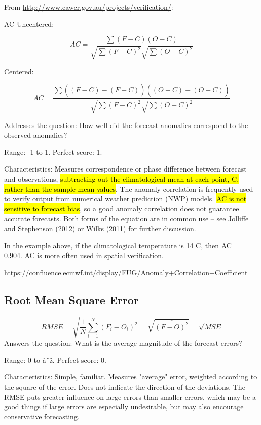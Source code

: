 \documentclass[12pt,a4paper]{article}
\begin{document}
From \url{http://www.cawcr.gov.au/projects/verification/}:

AC Uncentered:

\begin{equation}
AC = \frac{\sum {(F-C)(O-C)}}{\sqrt{\sum{(F-C)^2}} \sqrt{\sum{(O-C)^2}}}    
\end{equation}

Centered:

\begin{equation}
AC = \frac{
\sum{ \left( (F-C) - \overline{(F-C)} \right) \left( (O-C) - \overline{(O-C)} \right)}}
{\sqrt{\sum{ (F-C)^2}} \sqrt{\sum{(O-C)^2}}}  
\end{equation}

Addresses the question: How well did the forecast anomalies correspond to the observed anomalies?

Range: -1 to 1.  Perfect score: 1.

Characteristics: Measures correspondence or phase difference between forecast and observations, \hl{subtracting out the climatological mean at each point, C, rather than the sample mean values}. The anomaly correlation is frequently used to verify output from numerical weather prediction (NWP) models. \hl{AC is not sensitive to forecast bias}, so a good anomaly correlation does not guarantee accurate forecasts. Both forms of the equation are in common use -- see Jolliffe and Stephenson (2012) or Wilks (2011) for further discussion.

In the example above, if the climatological temperature is 14 C, then AC = 0.904. AC is more often used in spatial verification.


https://confluence.ecmwf.int/display/FUG/Anomaly+Correlation+Coefficient

\subsection{Root Mean Square Error}

\begin{equation}
RMSE = \sqrt{ \frac{1}{N} \sum_{i=1}^{N} (F_i - O_i)^2 } = \sqrt{ \overline{ (F-O)^2 } } = \sqrt{MSE}
\end{equation}
Answers the question: What is the average magnitude of the forecast errors?

Range: 0 to âˆž.  Perfect score: 0.

Characteristics: Simple, familiar. Measures "average" error, weighted according to the square of the error. Does not indicate the direction of the deviations. The RMSE puts greater influence on large errors than smaller errors, which may be a good things if large errors are especially undesirable, but may also encourage conservative forecasting.
\end{document}
